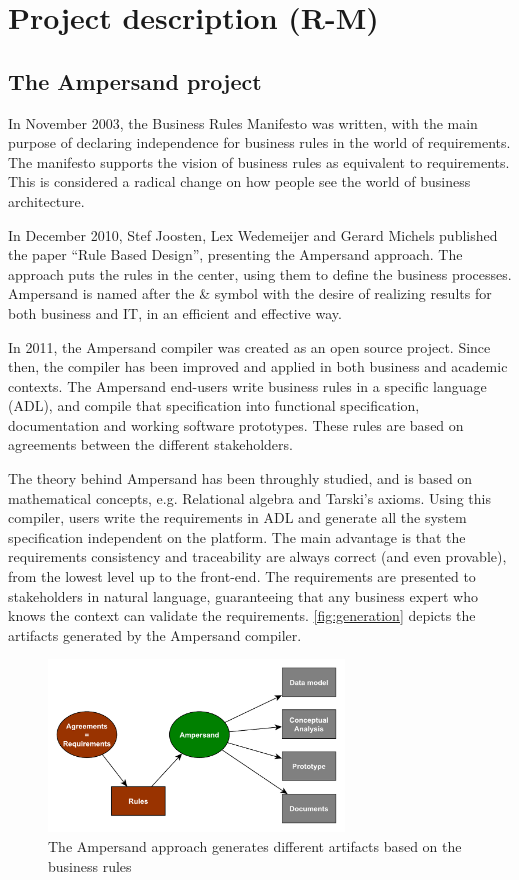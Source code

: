 \section{Project description (R-M)}
\label{sec:project-description}

\subsection{The Ampersand project}
In November 2003, the Business Rules Manifesto\cite{business-rules} was written, with the main purpose of declaring independence for business rules in the world of requirements.
The manifesto supports the vision of business rules as equivalent to requirements.
This is considered a radical change on how people see the world of business architecture.

In December 2010, Stef Joosten, Lex Wedemeijer and Gerard Michels published the paper ``Rule Based Design'', presenting the Ampersand approach.
The approach puts the rules in the center, using them to define the business processes.
Ampersand is named after the \& symbol with the desire of realizing results for both business and IT, in an efficient and effective way.

In 2011, the Ampersand compiler was created as an open source project.
Since then, the compiler has been improved and applied in both business and academic contexts.
The Ampersand end-users write business rules in a specific language (ADL), and compile that specification into functional specification, documentation and working software prototypes.
%
These rules are based on agreements between the different stakeholders.

The theory behind Ampersand has been throughly studied, and is based on mathe\-matical concepts, e.g. Relational algebra and Tarski's axioms.
Using this compiler, users write the requirements in ADL and generate all the system specification independent on the platform.
The main advantage is that the requirements consistency and traceability are always correct (and even provable), from the lowest level up to the front-end.
The requirements are presented to stakeholders in natural language, guaranteeing that any business expert who knows the context can validate the requirements.
\autoref{fig:generation} depicts the artifacts generated by the Ampersand compiler.
%
\begin{figure}[htb]
	\centering
	\includegraphics[width=0.7\textwidth]{Figures/Generation}
	\caption[Generated artifacts]{The Ampersand approach generates different artifacts based on the business rules}
	\label{fig:generation}
\end{figure}

